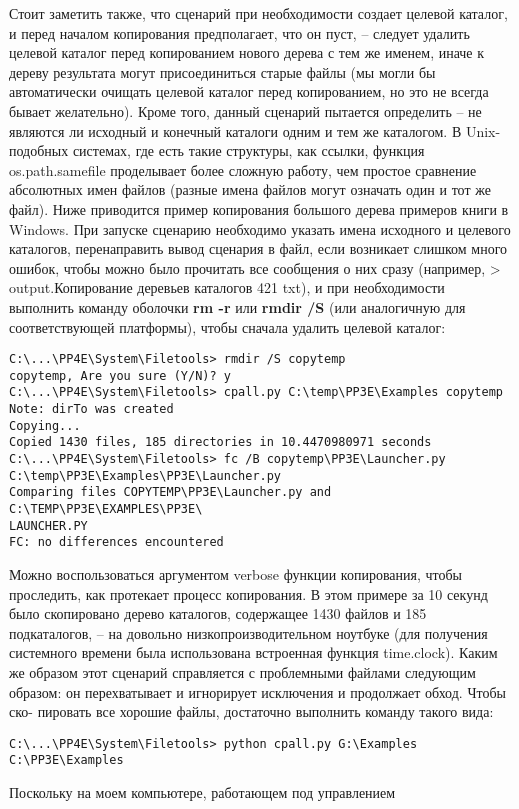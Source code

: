 \documentclass[12pt]{article}
\begin{document}
Стоит заметить также, что сценарий при необходимости создает целевой каталог, и перед началом копирования предполагает, что он пуст, – следует удалить
целевой каталог перед копированием нового дерева с тем же именем,
иначе к дереву результата могут присоединиться старые файлы (мы
могли бы автоматически очищать целевой каталог перед копированием, но это не всегда бывает желательно). Кроме того, данный сценарий
пытается определить – не являются ли исходный и конечный каталоги
одним и тем же каталогом. В Unix-подобных сис­темах, где есть такие
структуры, как ссылки, функция os.path.samefile проделывает более
сложную работу, чем простое сравнение абсолютных имен файлов (разные имена файлов могут означать один и тот же файл).
Ниже приводится пример копирования большого дерева примеров книги в Windows. При запуске сценарию необходимо указать имена исходного и целевого каталогов, перенаправить
вывод сценария в файл, если возникает слишком много ошибок, чтобы
можно было прочитать все сообщения о них сразу (например, > output.Копирование деревьев каталогов
421
txt), и при необходимости выполнить команду оболочки \textbf{rm -r} или \textbf{rmdir
/S} (или аналогичную для соответствующей платформы), чтобы сначала
удалить целевой каталог:
\begin{verbatim}
C:\...\PP4E\System\Filetools> rmdir /S copytemp
copytemp, Are you sure (Y/N)? y
C:\...\PP4E\System\Filetools> cpall.py C:\temp\PP3E\Examples copytemp
Note: dirTo was created
Copying...
Copied 1430 files, 185 directories in 10.4470980971 seconds
C:\...\PP4E\System\Filetools> fc /B copytemp\PP3E\Launcher.py
C:\temp\PP3E\Examples\PP3E\Launcher.py
Comparing files COPYTEMP\PP3E\Launcher.py and C:\TEMP\PP3E\EXAMPLES\PP3E\
LAUNCHER.PY
FC: no differences encountered
\end{verbatim}
Можно воспользоваться аргументом verbose функции копирования,
чтобы проследить, как протекает процесс копирования. В этом примере за 10 секунд было
скопировано дерево каталогов, содержащее 1430 файлов и 185 подкаталогов, – на довольно низкопроизводительном ноутбуке (для получения сис­темного времени была использована встроенная функция time.clock).
Каким же образом этот сценарий справляется с проблемными файлами
следующим образом: он перехватывает и игнорирует исключения и продолжает обход. Чтобы ско-
пировать все хорошие файлы, достаточно выполнить команду такого
вида:
\begin{verbatim}
C:\...\PP4E\System\Filetools> python cpall.py G:\Examples C:\PP3E\Examples
\end{verbatim}
Поскольку на моем компьютере, работающем под управлением
\end{document}
